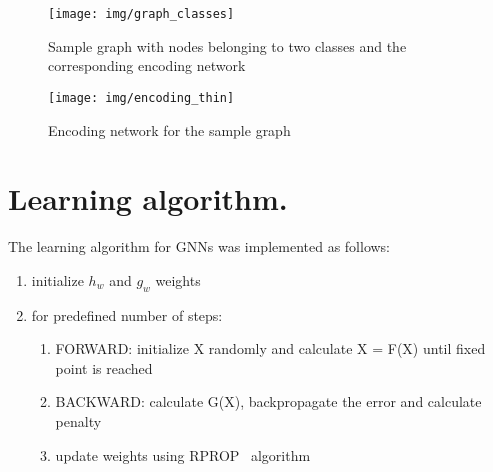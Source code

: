 \documentclass[a4paper, 11pt, twocolumn]{spie}  %
\begin{document}
\begin{figure}
\begin{center}
	\texttt{[image: img/graph\_classes]}
	\caption{Sample graph with nodes belonging to two classes and the corresponding encoding network}
	\label{fig:graph}
\end{center}
\end{figure}

\begin{figure}
\begin{center}
	\texttt{[image: img/encoding\_thin]}
	\caption{Encoding network for the sample graph}
	\label{fig:enc}
\end{center}
\end{figure}

\section{Learning algorithm.}
The learning algorithm for GNNs was implemented as follows:
\begin{enumerate}
	\item initialize $h_w$ and $g_w$ weights
	\item for predefined number of steps:
	\begin{enumerate}
		\item FORWARD: initialize X randomly and calculate X = F(X) until fixed point is reached
		\item BACKWARD: calculate G(X), backpropagate the error and calculate penalty
		\item update weights using RPROP~ algorithm
	\end{enumerate}
\end{enumerate}
\end{document}
